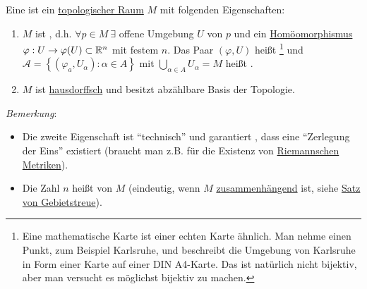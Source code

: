 \begin{definition}
  \label{def:topologischeMannigfaltigkeit}
  Eine  ist ein \hyperref[def:topologie]{topologischer Raum} $ M $ mit folgenden Eigenschaften:
  \begin{enumerate}
    \item $ M $ ist \label{def:lokalEuklidisch}, d.h. $ \forall p \in M \ \exists $ offene Umgebung $ U $ von $ p $ und ein \hyperref[def:homoeomorphismus]{Homöomorphismus} $ \varphi: U \to \varphi(U) \subset \mathbb{R}^n $ mit festem $ n $. Das Paar $ (\varphi, U) $ heißt \label{def:karte}\footnote{Eine mathematische Karte ist einer echten Karte ähnlich. Man nehme einen Punkt, zum Beispiel Karlsruhe, und beschreibt die Umgebung von Karlsruhe in Form einer Karte auf einer DIN A4-Karte. Das ist natürlich nicht bijektiv, aber man versucht es möglichst bijektiv zu machen.} und $ \mathcal{A} = \left\{ (\varphi_a, U_\alpha) : \alpha \in A \right\} $ mit $ \bigcup_{\alpha \in A}U_\alpha = M $ heißt \label{def:atlas}.
    \item $ M $ ist \hyperref[def:hausdorffsch]{hausdorffsch} und besitzt abzählbare Basis der Topologie.
  \end{enumerate}
  \emph{Bemerkung}:
  \begin{itemize}
    \item Die zweite Eigenschaft ist ``technisch'' und garantiert , dass eine ``Zerlegung der Eins'' existiert (braucht man z.B. für die Existenz von \hyperref[def:riemannscheMetrik]{Riemannschen Metriken}). 
    \item Die Zahl $ n $ heißt \label{def:dimension} von $ M $ (eindeutig, wenn $ M $ \hyperref[def:zusammenhaengend]{zusammenhängend} ist, siehe \hyperref[th:satzGebietstreue]{Satz von Gebietstreue}). 
  \end{itemize}
\end{definition}

